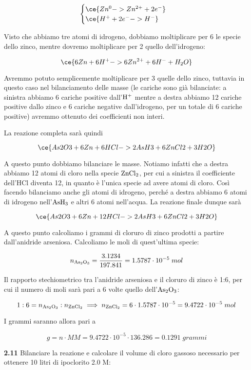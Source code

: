 $$\begin{cases}
    \ce{Zn^{0} -> Zn^{2+} + 2e^-}\\
    \ce{H^+ + 2e^- -> H^-}
\end{cases}$$

Visto che abbiamo tre atomi di idrogeno, dobbiamo moltiplicare per 6 le specie dello zinco, mentre dovremo moltiplicare per 2 quello dell'idrogeno:

$$\ce{6Zn + 6H^+ -> 6Zn^{2+} + 6H^- + H_2O}$$

Avremmo potuto semplicemente moltiplicare per 3 quelle dello zinco, tuttavia in questo caso nel bilanciamento delle masse (le cariche sono già bilanciate: a sinistra abbiamo 6 cariche positive dall'$\rm H^+$ mentre a destra abbiamo 12 cariche positive dallo zinco e 6 cariche negative dall'idrogeno, per un totale di 6 cariche positive) avremmo ottenuto dei coefficienti non interi.

La reazione completa sarà quindi 

$$\ce{As2O3 + 6Zn + 6HCl -> 2AsH3 + 6ZnCl2 + 3H2O}$$

A questo punto dobbiamo bilanciare le masse. Notiamo infatti che a destra abbiamo 12 atomi di cloro nella specie $\rm ZnCl_2$, per cui a sinistra il coefficiente dell'HCl diventa 12, in quanto è l'unica specie ad avere atomi di cloro. Così facendo bilanciamo anche gli atomi di idrogeno, perché a destra abbiamo 6 atomi di idrogeno nell'$\rm AsH_3$ e altri 6 atomi nell'acqua. La reazione finale dunque sarà

$$\ce{As2O3 + 6Zn + 12HCl -> 2AsH3 + 6ZnCl2 + 3H2O}$$

A questo punto calcoliamo i grammi di cloruro di zinco prodotti a partire dall'anidride arseniosa. Calcoliamo le moli di quest'ultima specie:

$$n_{\rm As_2O_3}=\frac{3.1234}{197.841}
=1.5787 \cdot 10^{-5}\;mol$$

Il rapporto stechiometrico tra l'anidride arseniosa e il cloruro di zinco è 1:6, per cui il numero di moli sarà pari a 6 volte quello dell'$\rm As_2O_3$:

$$1:6=n_{\rm As_2O_3}:n_{\rm ZnCl_2}
\implies
n_{\rm ZnCl_2}=6 \cdot 1.5787 \cdot 10^{-5}
=9.4722 \cdot 10^{-5}\;mol$$

I grammi saranno allora pari a 

$$g=n \cdot MM
=9.4722 \cdot 10^{-5} \cdot 136.286
=0.1291\;grammi$$

\vspace{0.2cm}\textbf{2.11} Bilanciare la reazione e calcolare il volume di cloro gassoso necessario per ottenere 10 litri di ipoclorito 2.0 M:

